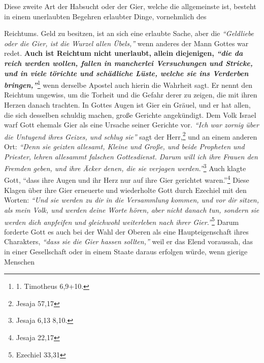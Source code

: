 Diese zweite Art der Habsucht oder der Gier, welche die allgemeinste ist,
besteht in einem unerlaubten Begehren erlaubter Dinge, vornehmlich des

 Reichtums. Geld zu besitzen, ist an sich eine erlaubte Sache, aber die
\textit{"`Geldliebe oder die Gier, ist die Wurzel allen Übels,"'} wenn anderes
der Mann
Gottes war redet. \label{ref:13_05_reichtum} \textbf{Auch ist
Reichtum nicht unerlaubt, allein diejenigen,
\textit{"`die da reich werden wollen, fallen in mancherlei Versuchungen und
Stricke, und in
viele törichte und schädliche Lüste, welche sie ins Verderben
bringen,"'}}\footnote{1. Timotheus 6,9+10.}
wenn derselbe Apostel auch hierin die
Wahrheit sagt. Er nennt den Reichtum ungewiss, um die Torheit und die Gefahr
derer zu zeigen, die mit ihren Herzen danach trachten. In Gottes Augen ist
Gier ein Gräuel, und er hat allen, die sich desselben schuldig machen, große
Gerichte angekündigt. Dem Volk
Israel warf Gott ehemals Gier als eine
Ursache seiner Gerichte vor.
\textit{"`Ich war zornig über die Untugend ihres Geizes,
und schlug sie"'} sagt der Herr,\footnote{Jesaja 57,17}
und an einem anderen Ort:
\textit{"`Denn sie geizten
 allesamt, Kleine und Große, und beide Propheten und
Priester, lehren allesammt falschen Gottesdienst. Darum will ich ihre Frauen den
Fremden geben, und ihre Äcker denen, die sie verjagen werden."'}\footnote{Jesaja 6,13 8,10.}
Auch klagte Gott,
"`dass ihre Augen und ihr Herz nur auf ihre Gier
gerichtet waren."'\footnote{Jesaja 22,17}
Diese Klagen über ihre Gier erneuerte
und wiederholte Gott durch Ezechiel mit den Worten:
\textit{"`Und sie werden zu dir
in die Versammlung kommen, und vor dir sitzen, als mein Volk, und werden deine
Worte hören, aber nicht danach tun, sondern sie werden dich anpfeifen und
gleichwohl weiterleben nach ihrer Gier."'}\footnote{Ezechiel 33,31}
Darum forderte
Gott es auch bei der Wahl der Oberen als eine Haupteigenschaft ihres Charakters,
\textit{"`dass sie die Gier hassen sollten,"'} weil er das Elend voraussah, das
in einer
Gesellschaft oder in einem Staate daraus erfolgen würde, wenn
gierige Menschen
